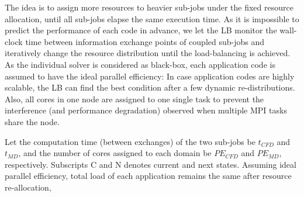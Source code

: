 \documentclass[preprint,12pt]{elsarticle}
\newcommand{\skonote}[1]{ {\textcolor{green} { ***Jeff: #1 }}}
\newcommand{\skonote}[1]{}
\begin{document}
The idea is to assign more resources to heavier sub-jobs 
under the fixed resource allocation, until all sub-jobs elapse the same execution time.
As it is impossible to predict the performance of each code in advance, we let 
the LB monitor the wall-clock time between information exchange points of 
coupled sub-jobs and iteratively change the resource distribution 
until the load-balancing is achieved. As the individual solver is considered as black-box, 
each application code is assumed to have the ideal parallel efficiency: 
In case application codes are highly scalable, the LB can find the best condition 
after a few dynamic re-distributions. Also, all cores in one node are assigned to 
one single task to prevent the interference (and performance degradation)
observed when multiple MPI tasks share the node.




Let the computation time (between exchanges) of the two sub-jobs be $t_{CFD}$ and $t_{MD}$, and the number of cores assigned to each domain be $PE_{CFD}$ and $PE_{MD}$, respectively. Subscripts C and N denotes current and next states. Assuming ideal parallel efficiency, total load of each application remains the same after resource re-allocation,
\end{document}
